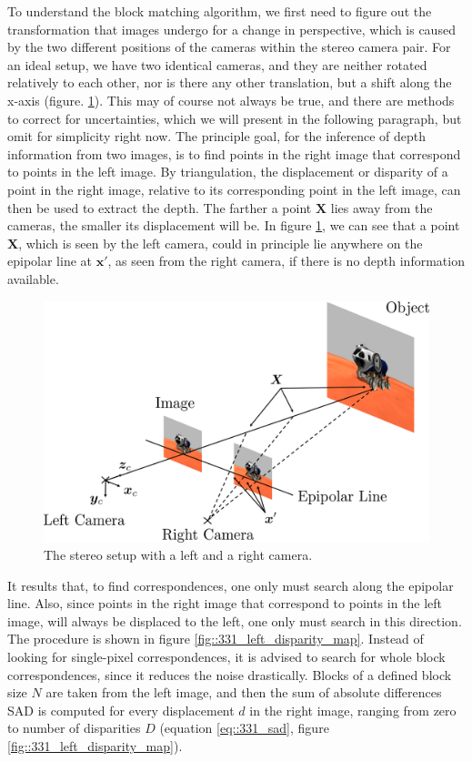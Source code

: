 To understand the block matching algorithm, we first need to figure out the transformation that images undergo for a change in perspective, which is caused by the two different positions of the cameras within the stereo camera pair. For an ideal setup, we have two identical cameras, and they are neither rotated relatively to each other, nor is there any other translation, but a shift along the x-axis (figure. \ref{fig::331_stereo_camera}). This may of course not always be true, and there are methods to correct for uncertainties, which we will present in the following paragraph, but omit for simplicity right now. The principle goal, for the inference of depth information from two images, is to find points in the right image that correspond to points in the left image. By triangulation, the displacement or disparity of a point in the right image, relative to its corresponding point in the left image, can then be used to extract the depth. The farther a point $\bm{X}$ lies away from the cameras, the smaller its displacement will be. In figure \ref{fig::331_stereo_camera}, we can see that a point $\bm{X}$, which is seen by the left camera, could in principle lie anywhere on the epipolar line at $\bm{x}'$, as seen from the right camera, if there is no depth information available. 
\begin{figure}[h!]
	\centering
	\includegraphics[scale=.28]{chapters/03_principles_of_machine_learning/img/stereo_camera.png}
	\caption{The stereo setup with a left and a right camera.}
	\label{fig::331_stereo_camera}
\end{figure}
It results that, to find correspondences, one only must search along the epipolar line. Also, since points in the right image that correspond to points in the left image, will always be displaced to the left, one only must search in this direction. The procedure is shown in figure \ref{fig::331_left_disparity_map}. Instead of looking for single-pixel correspondences, it is advised to search for whole block correspondences, since it reduces the noise drastically. Blocks of a defined block size $N$ are taken from the left image, and then the sum of absolute differences SAD is computed for every displacement $d$ in the right image, ranging from zero to number of disparities $D$ (equation \ref{eq::331_sad}, figure \ref{fig::331_left_disparity_map}).
